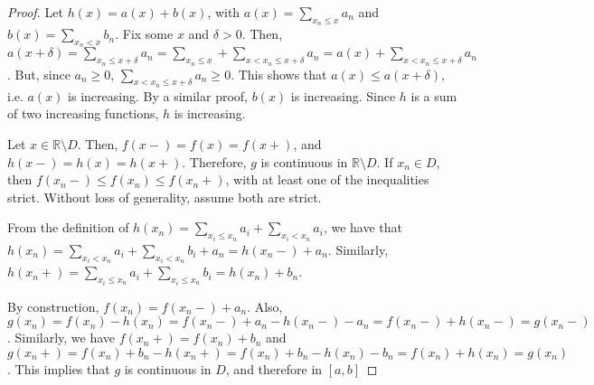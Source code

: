 \begin{proof}
Let $h(x) = a(x) + b(x)$, with $a(x) = \sum_{x_n \leq x} a_n$ and $b(x) = \sum_{x_n<x} b_n$. Fix some $x$ and $\delta > 0$. Then, $a(x+\delta) = \sum_{x_n \leq x+\delta} a_n = \sum_{x_n \leq x} + \sum_{x < x_n \leq x+\delta} a_n = a(x) + \sum_{x < x_n \leq x+\delta} a_n$. But, since $a_n \geq 0$, $\sum_{x < x_n \leq x+\delta} a_n \geq 0$. This shows that $a(x) \leq a(x+\delta)$, i.e. $a(x)$ is increasing. By a similar proof, $b(x)$ is increasing. Since $h$ is a sum of two increasing functions, $h$ is increasing.

Let $x\in \mathbb{R} \setminus D$. Then, $f(x-) = f(x) = f(x+)$, and $h(x-) = h(x) = h(x+)$. Therefore, $g$ is continuous in $\mathbb{R} \setminus D$. If $x_n\in D$, then $f(x_n-) \leq f(x_n) \leq f(x_n+)$, with at least one of the inequalities strict. Without loss of generality, assume both are strict.

From the definition of $h(x_n) = \sum_{x_i \leq x_n} a_i + \sum_{x_i < x_n} a_i$, we have that $h(x_n) = \sum_{x_i < x_n} a_i + \sum_{x_i < x_n} b_i + a_n = h(x_n-) + a_n$. Similarly, $h(x_n+) = \sum_{x_i \leq x_n} a_i + \sum_{x_i \leq x_n} b_i = h(x_n) + b_n$. 

By construction, $f(x_n) = f(x_n-) + a_n$. Also, $g(x_n) = f(x_n) - h(x_n) = f(x_n-) + a_n - h(x_n-) - a_n = f(x_n-) + h(x_n-) = g(x_n-)$. Similarly, we have $f(x_n+) = f(x_n) + b_n$ and $g(x_n+) = f(x_n) + b_n - h(x_n+) = f(x_n) + b_n - h(x_n) - b_n = f(x_n) + h(x_n) = g(x_n)$. This implies that $g$ is continuous in $D$, and therefore in $[a,b]$

\end{proof}

